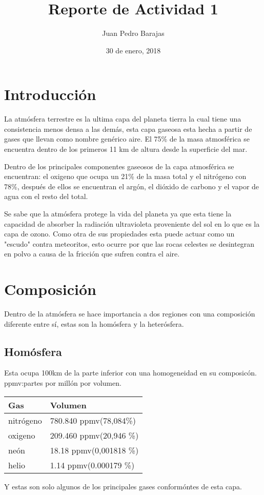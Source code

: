 \documentclass{article} %
\title{Reporte de Actividad 1}
\author{Juan Pedro Barajas}
\date{30 de enero, 2018}
\begin{document}
\maketitle
\section{Introducción} %
La atmósfera terrestre es la ultima capa del planeta tierra la cual tiene una consistencia menos densa a las demás, esta capa gaseosa esta hecha a partir de gases que llevan como nombre genérico aire. El 75\%  de la masa atmosférica se encuentra dentro de los primeros 11 km de altura desde la superficie del mar.
\par
\vspace{0.5cm}
Dentro de los principales componentes gaseosos de la capa atmosférica se encuentran: el oxigeno que ocupa un 21\% de la masa total y el nitrógeno con 78\%, después de ellos se encuentran el argón, el dióxido de carbono y el vapor de agua con el resto del total.
\par
\vspace{0.5cm}
Se sabe que la atmósfera protege la vida del planeta ya que esta tiene la capacidad de absorber la radiación ultravioleta proveniente del sol en lo que es la capa de ozono. Como otra de sus propiedades esta puede actuar como un "escudo" contra meteoritos, esto ocurre por que las rocas celestes se desintegran en polvo a causa de la fricción que sufren contra el aire.
\section{Composición} %
Dentro de la atmósfera se hace importancia a dos regiones con una composición diferente entre sí, estas son la homósfera y la heterósfera.
\subsection{Homósfera}
Esta ocupa 100km de la parte inferior con una homogeneidad en su composicón.
\linebreak %
ppmv:partes por millón por volumen.
\vspace{0.5cm}
\begin{tabular}{|l|l|}
Gas & Volumen  \\\hline
nitrógeno & 780.840 ppmv(78,084\%) \\\hline
oxigeno & 209.460 ppmv(20,946 \%) \\\hline neón & 18.18 ppmv(0,001818 \%) \\\hline
helio & 1.14 ppmv(0.000179 \%) \\\hline
\end{tabular} %
\vspace{0.5cm}
Y estas son solo algunos de los principales gases conformóntes de esta capa.
\end{document}
